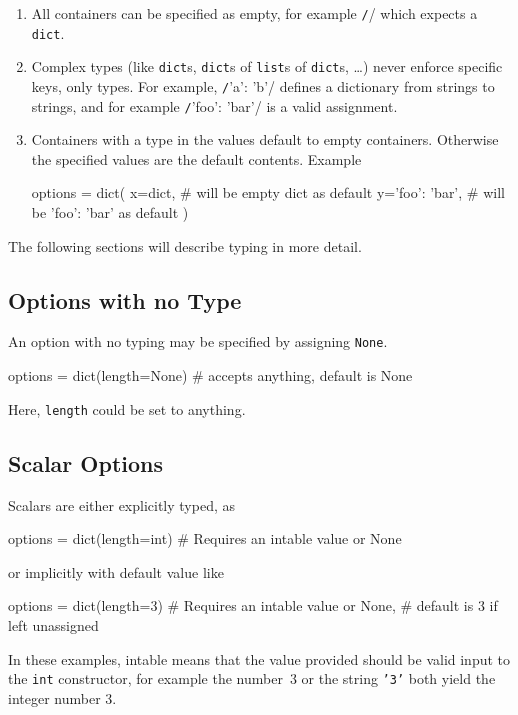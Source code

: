 \begin{enumerate}
\item All containers can be specified as empty, for example
  \texttt/{}/ which expects a \texttt{dict}.

\item Complex types (like \texttt{dict}s, \texttt{dict}s of
  \texttt{list}s of \texttt{dict}s, \dots) never enforce specific
  keys, only types.  For example, \texttt/{'a': 'b'}/
  defines a dictionary from strings to strings, and for example
  \texttt/{'foo': 'bar'}/ is a valid
  assignment.

\item Containers with a type in the values default to empty containers.
  Otherwise the specified values are the default contents.  Example
  \begin{python}
options = dict(
    x=dict,           # will be empty dict as default
    y={'foo': 'bar'}, # will be {'foo': 'bar'} as default
)
  \end{python}
\end{enumerate}

The following sections will describe typing in more detail.



\subsection{Options with no Type}
An option with no typing may be specified by assigning \texttt{None}.
\begin{python}
options = dict(length=None)  # accepts anything, default is None
\end{python}
Here, \texttt{length} could be set to anything.



\subsection{Scalar Options}
Scalars are either explicitly typed, as
\begin{python}
options = dict(length=int)   # Requires an intable value or None
\end{python}
or implicitly with default value like
\begin{python}
options = dict(length=3)     # Requires an intable value or None,
                             # default is 3 if left unassigned
\end{python}
In these examples, intable means that the value provided should be
valid input to the \texttt{int} constructor, for example the number~3
or the string \texttt{'3'} both yield the integer number 3.



